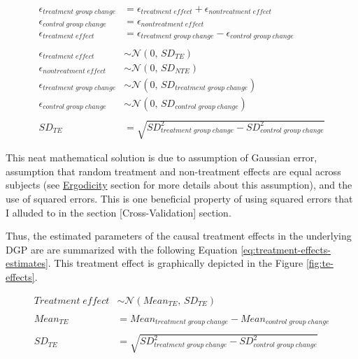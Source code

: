 \documentclass[
]{book}
\begin{document}
\begin{equation}
  \begin{split}
    \epsilon_{treatment \;group \;change} &= \epsilon_{treatment \; effect} + \epsilon_{nontreatment \; effect} \\
    \epsilon_{control \;group \;change} &= \epsilon_{nontreatment \; effect} \\
    \epsilon_{treatment \; effect} &= \epsilon_{treatment \;group \;change} - \epsilon_{control \;group \;change} \\
    \\
    \epsilon_{treatment \; effect}  &\sim \mathcal{N}(0,\,SD_{TE}) \\
    \epsilon_{nontreatment \; effect}  &\sim \mathcal{N}(0,\,SD_{NTE}) \\
    \epsilon_{treatment \;group \;change} &\sim \mathcal{N}(0,\,SD_{treatment \;group \;change}) \\
    \epsilon_{control \;group \;change} &\sim \mathcal{N}(0,\,SD_{control \;group \;change}) \\
    \\
    SD_{TE} &= \sqrt{SD_{treatment \;group \;change}^2 - SD_{control \;group \;change}^2}
  \end{split}
  \label{eq:sd-te-equation}
\end{equation}

This neat mathematical solution is due to assumption of Gaussian error, assumption that random treatment and non-treatment effects are equal across subjects (see \protect\hyperlink{ergodicity}{Ergodicity} section for more details about this assumption), and the use of squared errors. This is one beneficial property of using squared errors that I alluded to in the section {[}Cross-Validation{]} section.

Thus, the estimated parameters of the causal treatment effects in the underlying DGP are are summarized with the following Equation \eqref{eq:treatment-effects-estimates}. This treatment effect is graphically depicted in the Figure \ref{fig:te-effects}.

\begin{equation}
  \begin{split}
    Treatment \; effect &\sim \mathcal{N}(Mean_{TE},\,SD_{TE}) \\
    \\
    Mean_{TE} &= Mean_{treatment \;group \;change} - Mean_{control \;group \;change} \\ 
    \\
    SD_{TE} &= \sqrt{SD_{treatment \;group \;change}^2 - SD_{control \; group \; change}^2}
  \end{split}
  \label{eq:treatment-effects-estimates}
\end{equation}
\end{document}
